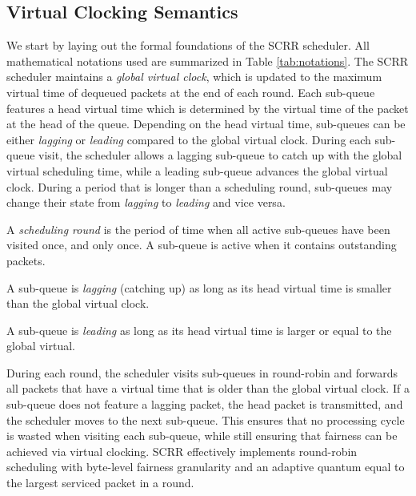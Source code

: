 


\subsection{Virtual Clocking Semantics}
\label{sec:scrr}

We start by laying out the formal foundations of the SCRR
scheduler. All mathematical notations used are summarized in Table
\ref{tab:notations}. The SCRR scheduler maintains a \textit{global
virtual clock}, which is updated to the maximum virtual time of dequeued
packets at the end of each round. Each sub-queue features a head
virtual time which is determined by the virtual time of the packet at
the head of the queue. Depending on the head virtual time, sub-queues can be either \textit{lagging} or \textit{leading} compared to the global
virtual clock. During each sub-queue visit, the scheduler allows
a lagging sub-queue to catch up with the global virtual scheduling
time, while a leading sub-queue advances the global virtual
clock. During a period that is longer than a scheduling round,
sub-queues may change their state from \textit{lagging} to
\textit{leading} and vice versa.


\begin{definition}
    A \textit{scheduling round} is the period of time when all active sub-queues have been visited once, and only once. A sub-queue is active when it contains outstanding packets.
\end{definition}

\begin{definition}
    A sub-queue is \textit{lagging} (catching up) as long as its head virtual time is smaller than the global virtual clock.
\end{definition}

\begin{definition}
    A sub-queue is \textit{leading} as long as its head virtual time is larger or equal to the global virtual.
\end{definition}

During each round, the scheduler visits sub-queues in round-robin and forwards all packets that have a virtual time that is older than the global virtual clock. If a sub-queue does not feature a lagging packet, the head packet is transmitted, and the scheduler moves to the next sub-queue. This ensures that no processing cycle is wasted when visiting each sub-queue, while still ensuring that fairness can be achieved via virtual clocking. 
SCRR effectively implements round-robin scheduling with byte-level fairness granularity and an adaptive quantum equal to the largest serviced packet in a round.
\\
\\
